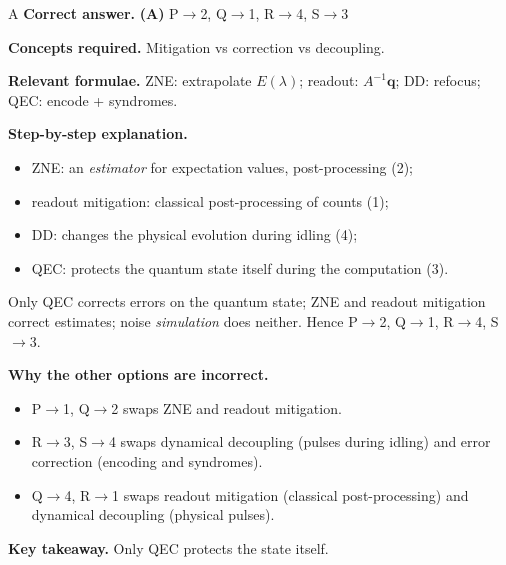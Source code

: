 \documentclass[11pt,a4paper]{article}
\newcommand{\qsep}{\par\vspace{2pt}{\color{black!15}\hrule}\vspace{4pt}}
\begin{document}
\begin{solbox}{A}
\textbf{\color{brand}Correct answer.} \textcolor{okgreen}{\textbf{(A)}} P$\to$2, Q$\to$1, R$\to$4, S$\to$3

\textbf{\color{brand}Concepts required.} Mitigation vs correction vs decoupling.

\textbf{\color{brand}Relevant formulae.} ZNE: extrapolate $E(\lambda)$; readout: $A^{-1}\mathbf q$; DD: refocus; QEC: encode + syndromes.

\textbf{\color{brand}Step-by-step explanation.} \begin{itemize}\itemsep0pt
\item ZNE: an \emph{estimator} for expectation values, post-processing (2);
\item readout mitigation: classical post-processing of counts (1);
\item DD: changes the physical evolution during idling (4);
\item QEC: protects the quantum state itself during the computation (3).
\end{itemize}
Only QEC corrects errors on the quantum state; ZNE and readout mitigation correct estimates; noise \emph{simulation} does neither. Hence P$\to$2, Q$\to$1, R$\to$4, S$\to$3.

\textbf{\color{brand}Why the other options are incorrect.}
\begin{itemize}[leftmargin=2.4em, itemsep=1pt, topsep=2pt]
\item[\textbf{(B)}] P$\to$1, Q$\to$2 swaps ZNE and readout mitigation.
\item[\textbf{(C)}] R$\to$3, S$\to$4 swaps dynamical decoupling (pulses during idling) and error correction (encoding and syndromes).
\item[\textbf{(D)}] Q$\to$4, R$\to$1 swaps readout mitigation (classical post-processing) and dynamical decoupling (physical pulses).
\end{itemize}
\textbf{\color{brand}Key takeaway.} Only QEC protects the state itself.
\end{solbox}
\qsep
\end{document}
